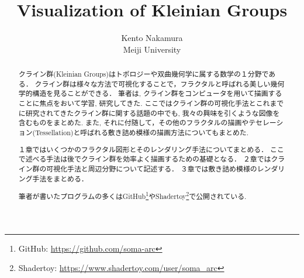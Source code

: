 \documentclass[dvipdfmx]{article}
\title{ Visualization of Kleinian Groups }
\author{ Kento Nakamura\\
Meiji University\\
}
\date{}
\begin{document}
\maketitle

\begin{abstract}
クライン群(Kleinian Groups)はトポロジーや双曲幾何学に属する数学の１分野である．
クライン群は様々な方法で可視化することで，フラクタルと呼ばれる美しい幾何学的構造を見ることができる．
筆者は, クライン群をコンピュータを用いて描画することに焦点をおいて学習, 研究してきた. 
ここではクライン群の可視化手法とこれまでに研究されてきたクライン群に関する話題の中でも, 我々の興味を引くような図像を含むものをまとめた. 
また, それに付随して，その他のフラクタルの描画やテセレーション(Tessellation)と呼ばれる敷き詰め模様の描画方法についてもまとめた. 

１章ではいくつかのフラクタル図形とそのレンダリング手法についてまとめる．
ここで述べる手法は後でクライン群を効率よく描画するための基礎となる．
２章ではクライン群の可視化手法と周辺分野について記述する．
３章では敷き詰め模様のレンダリング手法をまとめる．

筆者が書いたプログラムの多くはGitHub\footnote{GitHub: \url{https://github.com/soma-arc}}やShadertoy\footnote{Shadertoy: \url{https://www.shadertoy.com/user/soma\_arc}}で公開されている.

\end{abstract}

\tableofcontents








\end{document}
